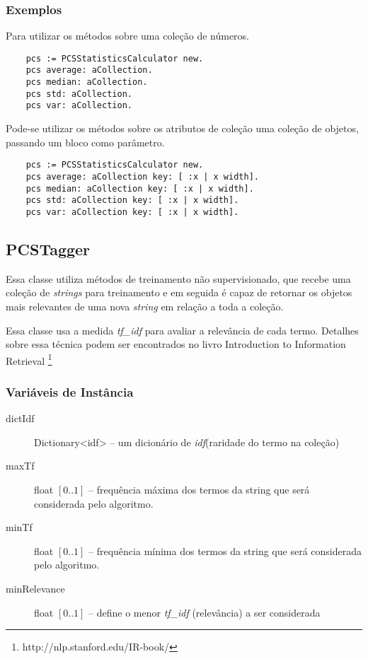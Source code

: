 \subsubsection{Exemplos}
Para utilizar os métodos sobre uma coleção de números.
    \begin{verbatim}
    pcs := PCSStatisticsCalculator new.
    pcs average: aCollection.
    pcs median: aCollection.
    pcs std: aCollection.
    pcs var: aCollection.
    \end{verbatim}

Pode-se utilizar os métodos sobre os atributos de coleção uma coleção de objetos, passando um
bloco como parâmetro.
    \begin{verbatim}
    pcs := PCSStatisticsCalculator new.
    pcs average: aCollection key: [ :x | x width].
    pcs median: aCollection key: [ :x | x width].
    pcs std: aCollection key: [ :x | x width].
    pcs var: aCollection key: [ :x | x width].
    \end{verbatim}


    
\subsection{PCSTagger}

Essa classe utiliza métodos de treinamento não supervisionado, que recebe uma coleção de
\textit{strings} para treinamento e em seguida é capaz de retornar os objetos mais relevantes
de uma nova \textit{string} em relação a toda a coleção.

Essa classe usa a medida \textit{tf\_idf} para avaliar a relevância de cada termo. Detalhes sobre
essa técnica podem ser encontrados no livro Introduction to Information Retrieval
\footnote{http://nlp.stanford.edu/IR-book/}

\subsubsection{Variáveis de Instância}
    
\begin{description}
    \item[dictIdf] Dictionary<idf> -- um dicionário de \textit{idf}(raridade do termo na
                   coleção)
    \item[maxTf] float $[0..1]$ -- frequência máxima dos termos da string que será considerada
                 pelo algoritmo.
    \item[minTf] float $[0..1]$ -- frequência mínima dos termos da string que será considerada
                 pelo algoritmo.
    \item[minRelevance] float $[0..1]$ --  define o menor \textit{tf\_idf} (relevância) a ser
                        considerada
\end{description}

